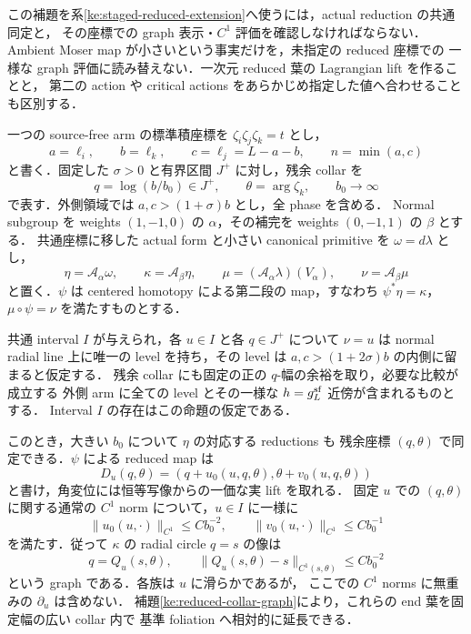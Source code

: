 この補題を系\ref{ke:staged-reduced-extension}へ使うには，actual reduction の共通同定と，
その座標での graph 表示・$C^1$ 評価を確認しなければならない．
Ambient Moser map が小さいという事実だけを，未指定の reduced 座標での
一様な graph 評価に読み替えない．一次元 reduced 葉の Lagrangian lift を作ることと，
第二の action や critical actions をあらかじめ指定した値へ合わせることも区別する．

\begin{proposition}
\label{ke:single-arm-reduced-graph}
一つの source-free arm の標準積座標を $\zeta_i\zeta_j\zeta_k=t$ とし，
\[
 a=\ell_i,\qquad b=\ell_k,\qquad c=\ell_j=L-a-b,
 \qquad n=\min(a,c)
\]
と書く．固定した $\sigma>0$ と有界区間 $J^+$ に対し，残余 collar を
\[
 q=\log(b/b_0)\in J^+,\qquad \theta=\arg\zeta_k,
 \qquad b_0\longrightarrow\infty
\]
で表す．外側領域では $a,c>(1+\sigma)b$ とし，全 phase を含める．
Normal subgroup を weights $(1,-1,0)$ の $\alpha$，その補完を
weights $(0,-1,1)$ の $\beta$ とする．
共通座標に移した actual form と小さい canonical primitive を $\omega=d\lambda$ とし，
\[
 \eta=\mathcal A_\alpha\omega,\qquad
 \kappa=\mathcal A_\beta\eta,\qquad
 \mu=(\mathcal A_\alpha\lambda)(V_\alpha),\qquad
 \nu=\mathcal A_\beta\mu
\]
と置く．$\psi$ は centered homotopy による第二段の map，すなわち
$\psi^*\eta=\kappa$，$\mu\circ\psi=\nu$ を満たすものとする．

共通 interval $I$ が与えられ，各 $u\in I$ と各 $q\in J^+$ について
$\nu=u$ は normal radial line 上に唯一の level を持ち，その level は
$a,c>(1+2\sigma)b$ の内側に留まると仮定する．
残余 collar にも固定の正の $q$-幅の余裕を取り，必要な比較が成立する
外側 arm に全ての level とその一様な $h=g_L^{\rm sf}$ 近傍が含まれるものとする．
Interval $I$ の存在はこの命題の仮定である．

このとき，大きい $b_0$ について $\eta$ の対応する reductions も
残余座標 $(q,\theta)$ で同定できる．$\psi$ による reduced map は
\begin{equation}\label{ke:eq:reduced-arm-map}
 D_u(q,\theta)=(q+u_0(u,q,\theta),\theta+v_0(u,q,\theta))
\end{equation}
と書け，角変位には恒等写像からの一価な実 lift を取れる．
固定 $u$ での $(q,\theta)$ に関する通常の $C^1$ norm について，$u\in I$ に一様に
\[
 \|u_0(u,\cdot)\|_{C^1}\le Cb_0^{-2},\qquad
 \|v_0(u,\cdot)\|_{C^1}\le Cb_0^{-1}
\]
を満たす．従って $\kappa$ の radial circle $q=s$ の像は
\begin{equation}\label{ke:eq:actual-reduced-circle-graph}
 q=Q_u(s,\theta),\qquad
 \|Q_u(s,\theta)-s\|_{C^1(s,\theta)}\le Cb_0^{-2}
\end{equation}
という graph である．各族は $u$ に滑らかであるが，
ここでの $C^1$ norms に無重みの $\partial_u$ は含めない．
補題\ref{ke:reduced-collar-graph}により，これらの end 葉を固定幅の広い collar 内で
基準 foliation へ相対的に延長できる．
\end{proposition}

